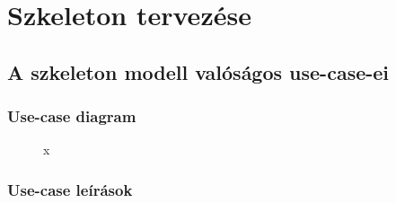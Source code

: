 %
\chapter{Szkeleton tervezése}

\thispagestyle{fancy}

\section{A szkeleton modell valóságos use-case-ei}

\subsection{Use-case diagram}

\begin{figure}[h]
\begin{center}
\caption{x}
\label{fig:SzkeletonUseCase}
\end{center}
\end{figure}

\subsection{Use-case leírások}


\pagebreak
\setlength\parindent{15mm}
